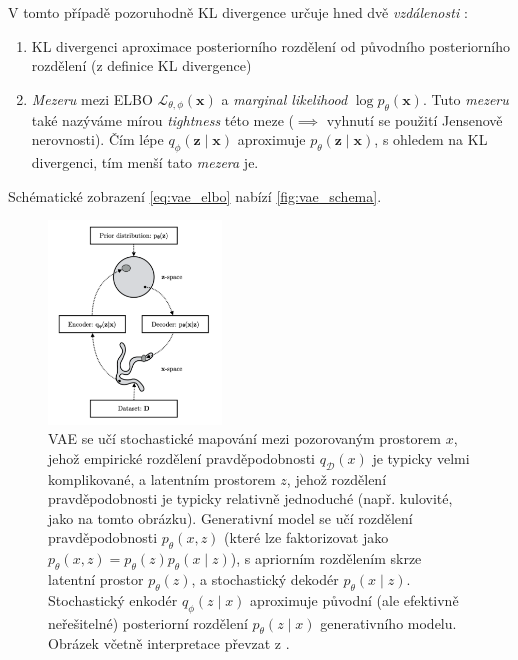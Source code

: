 V tomto případě pozoruhodně KL divergence určuje hned dvě \emph{vzdálenosti} \cite{Kingma2019}:
\begin{enumerate}
    \item KL divergenci aproximace posteriorního rozdělení od původního posteriorního rozdělení (z definice KL divergence)
    \item \emph{Mezeru} mezi ELBO $\mathcal{L}_{\theta,\phi}(\textbf{x})$ a \emph{marginal likelihood} $\log p_\theta(\textbf{x})$. Tuto \emph{mezeru} také nazýváme mírou \emph{tightness} této meze ($\implies$ vyhnutí se použití Jensenově nerovnosti). Čím lépe $q_\phi(\textbf{z}\mid\textbf{x})$ aproximuje $p_\theta(\textbf{z}\mid\textbf{x})$, s ohledem na KL divergenci, tím menší tato \emph{mezera} je.
\end{enumerate}

Schématické zobrazení \autoref{eq:vae_elbo} nabízí \autoref{fig:vae_schema}.

\begin{figure}[H]
    \centering
    \includegraphics[width=0.41\textwidth]{figures/vae_schema.pdf}
    \caption{VAE se učí stochastické mapování mezi pozorovaným prostorem $x$, jehož empirické rozdělení pravděpodobnosti $q_\mathcal{D}(x)$ je typicky velmi komplikované, a latentním prostorem $z$, jehož rozdělení pravděpodobnosti je typicky relativně jednoduché (např. kulovité, jako na tomto obrázku). Generativní model se učí rozdělení pravděpodobnosti $p_\theta(x, z)$ (které lze faktorizovat jako $p_\theta(x, z) = p_\theta(z) p_\theta(x\mid z)$), s apriorním rozdělením skrze latentní prostor $p_\theta(z)$, a stochastický dekodér $p_\theta(x\mid z)$. Stochastický enkodér $q_\phi(z\mid x)$ aproximuje původní (ale efektivně neřešitelné) posteriorní rozdělení $p_\theta(z\mid x)$ generativního modelu. Obrázek včetně interpretace převzat z \cite{Kingma2019}.}
    \label{fig:vae_schema}
\end{figure}



